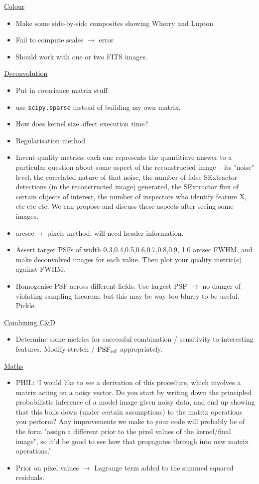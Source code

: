 \documentclass[letterpaper, 11pt]{article}
\def\psfref{\ensuremath{{\rm PSF_{ref}}}\xspace}
\def\ra{\ensuremath{\rightarrow}\xspace}
\def\TODO#1{ {\color{black}{\bf TODO: {#1}}}\xspace}
\begin{document}
\underline{Colour}
\begin{itemize}
	\item Make some side-by-side composites showing Wherry and Lupton
	\item Fail to compute scales $\rightarrow$ error
	\item Should work with one or two FITS images.
\end{itemize}

\underline{Deconvolution}
\begin{itemize}
	\item Put in covariance matrix stuff
	\item use \texttt{scipy.sparse} instead of building my own matrix.
	\item How does kernel size affect execution time?
	\item Regularisation method
	\item Invent quality metrics: each one represents the quantitiave answer to a particular question about some aspect of the reconstructed image -- its "noise" level, the correlated nature of that noise, the number of false SExtractor detections (in the reconstructed image) generated, the SExtractor flux of certain
objects of interest, the number of inspectors who identify feature X, etc etc etc. We can propose and discuss these aspects after seeing some images.
	\item arcsec\ra pixels method; will need header information.
	\item Assert target PSFs of width 0.3,0.4,0.5,0.6,0.7,0.8,0.9, 1.0 arcsec FWHM, and make deconvolved images for each value. Then plot your quality metric(s) against FWHM.
	\item Homogenise PSF across different fields. \TODO{What is the best way to do this?} Use largest PSF $\rightarrow$ no danger of violating sampling theorem; but this may be way too blurry to be useful. Pickle.
\end{itemize}

\underline{Combining C\&D}
\begin{itemize}
	\item Determine some metrics for successful combination / sensitivity to interesting features. Modify stretch / \psfref appropriately.
\end{itemize}

\underline{Maths}
\begin{itemize}
	\item PHIL: `I would like to see a derivation of this procedure, which involves a matrix acting on a noisy vector. Do you start by writing down the principled probabilistic inference of a model image given noisy data, and end up showing that this boils down (under certain assumptions) to the matrix operations you perform? Any improvements we make to your code will probably be of the form "assign a different prior to the pixel values of the kernel/final image", so it'd be good to see how that propagates through into new matrix operations.'

	\item Prior on pixel values \ra Lagrange term added to the summed squared residuals.
\end{itemize}
\end{document}
